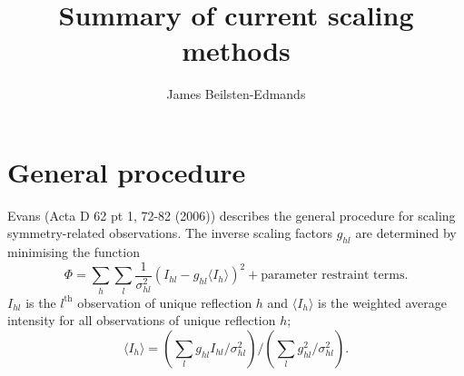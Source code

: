 \documentclass[11pt, oneside]{article}   	%
\title{Summary of current scaling methods}
\author{James Beilsten-Edmands}
\begin{document}
\maketitle

\section{General procedure}

Evans (Acta D 62 pt 1, 72-82 (2006)) describes the general procedure for scaling symmetry-related observations. The inverse scaling factors $g_{hl}$ are determined by minimising the function
\begin{equation}
\Phi = \sum_h \sum_l \frac{1}{\sigma^2_{hl}} (I_{hl} - g_{hl} \langle I_h \rangle)^2 + \text{parameter restraint terms}.
\end{equation}
$I_{hl}$ is the $l^{\text{th}}$ observation of unique reflection $h$ and $\langle I_h \rangle$ is the weighted average intensity for all observations of unique reflection $h$;
\begin{equation}
\langle I_h \rangle = (\sum_l g_{hl} I_{hl}/\sigma^2_{hl}) /  (\sum_l g^2_{hl} /\sigma^2_{hl}).
\end{equation}
\end{document}
